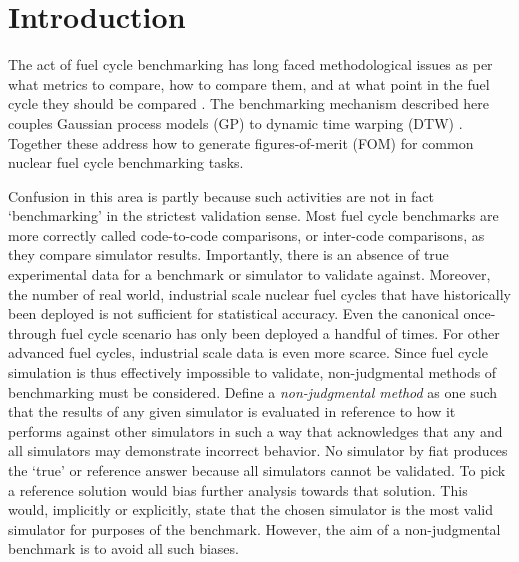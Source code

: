 \section{Introduction}
\label{intro}
The act of fuel cycle benchmarking has long faced methodological issues 
as per what metrics to compare, how to compare them, and at what point in the
fuel cycle they should be compared 
\cite{wilson2011comparing,guerin2009benchmark,piet2011assessment}. 
The benchmarking mechanism described 
here couples Gaussian process models (GP) \cite{rasmussen2006gaussian} to 
dynamic time warping (DTW) \cite{muller}. Together these address how to 
generate figures-of-merit (FOM) for common nuclear fuel cycle benchmarking
tasks. 

Confusion in this area is partly because such activities 
are not in fact `benchmarking' in the strictest validation sense. Most fuel
cycle benchmarks are more correctly called code-to-code comparisons, or 
inter-code comparisons, as they compare simulator results. Importantly, 
there is an absence of true experimental data for a benchmark or simulator
to validate against. Moreover, the number of 
real world, industrial scale nuclear fuel cycles that have historically been 
deployed is not sufficient for statistical accuracy. Even the canonical 
once-through fuel cycle scenario has only been deployed a handful of times.
For other advanced fuel cycles, industrial scale data is even more scarce. 
Since fuel cycle simulation is thus effectively impossible to validate, 
non-judgmental methods of benchmarking must be considered. 
Define a \emph{non-judgmental method} as one such that the 
results of any given simulator is evaluated in reference to how 
it performs against other simulators in such a way that acknowledges that 
any and all simulators may demonstrate incorrect behavior. No simulator
by fiat produces the `true' or reference answer because all simulators 
cannot be validated. To pick a reference solution would bias further analysis 
towards that solution. This would, implicitly or explicitly, state that the
chosen simulator is the most valid simulator for purposes of the benchmark. 
However, the aim of a non-judgmental benchmark is to avoid all such biases.

